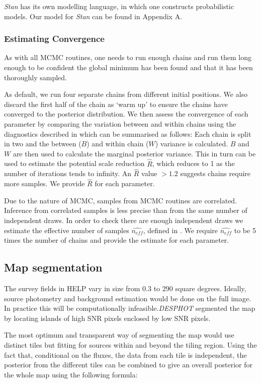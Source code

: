 \documentclass[useAMS,usenatbib]{mnras}
\begin{document}
\textit{Stan} has its own modelling language, in which one constructs probabilistic models. Our model for \textit{Stan} can be found in Appendix A.
\subsubsection{Estimating Convergence}\label{sec:conv}
As with all MCMC routines, one needs to run enough chains and run them long enough to be confident the global minimum has been found and that it has been thoroughly sampled. 

As default, we run four separate chains from different initial positions. We also discard the first half of the chain as `warm up' to ensure the chains have converged to the posterior distribution. We then assess the convergence of each parameter by comparing the variation between and within chains using the diagnostics described in \cite{BDA3} which can be summarised as follows: Each chain is split in two and the between ($B$) and within chain ($W$) variance is calculated. $B$ and $W$ are then used to calculate the marginal posterior variance. This in turn can be used to estimate the potential scale reduction $\hat{R}$, which reduces to 1 as the number of iterations tends to infinity. An $\hat{R}$ value $> 1.2$ suggests chains require more samples. We provide $\hat{R}$ for each parameter.

Due to the nature of MCMC, samples from MCMC routines are correlated. Inference from correlated samples is less precise than from the same number of independent draws. In order to check there are enough independent draws we estimate the effective number of samples $\hat{n_{eff}}$, defined in \cite{BDA3}. We require $\hat{n_{eff}}$ to be 5 times the number of chains and provide the estimate for each parameter.

\subsection{Map segmentation}
The survey fields in HELP vary in size from 0.3 to 290 square degrees. Ideally, source photometry and background estimation would be done on the full image. In practice this will be computationally infeasible.\emph{DESPHOT} segmented the map by locating islands of high SNR pixels enclosed by low SNR pixels.

The most optimum and transparent way of segmenting the map would use distinct tiles but fitting for sources within and beyond the tiling region. Using the fact that, conditional on the fluxes, the data from each tile is independent, the posterior from the different tiles can be combined to give an overall posterior for the whole map using the following formula:
\end{document}
